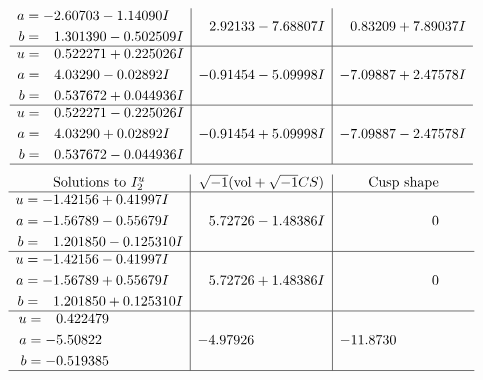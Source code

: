 \documentclass[1p]{elsarticle_modified}
\theoremstyle{definition}
\newcommand{\I}{\sqrt{-1}}
\begin{document}
$$\begin{array}{c|c|c}
\begin{aligned}
a &= -2.60703 - 1.14090 I \\
b &= \phantom{-}1.301390 - 0.502509 I\end{aligned}
 & \phantom{-}2.92133 - 7.68807 I & \phantom{-}0.83209 + 7.89037 I \\ \hline\begin{aligned}
u &= \phantom{-}0.522271 + 0.225026 I \\
a &= \phantom{-}4.03290 - 0.02892 I \\
b &= \phantom{-}0.537672 + 0.044936 I\end{aligned}
 & -0.91454 - 5.09998 I & -7.09887 + 2.47578 I \\ \hline\begin{aligned}
u &= \phantom{-}0.522271 - 0.225026 I \\
a &= \phantom{-}4.03290 + 0.02892 I \\
b &= \phantom{-}0.537672 - 0.044936 I\end{aligned}
 & -0.91454 + 5.09998 I & -7.09887 - 2.47578 I\\
 \hline 
 \end{array}$$\newpage$$\begin{array}{c|c|c}  
\text{Solutions to }I^u_{2}& \I (\text{vol} + \sqrt{-1}CS) & \text{Cusp shape}\\
 \hline 
\begin{aligned}
u &= -1.42156 + 0.41997 I \\
a &= -1.56789 - 0.55679 I \\
b &= \phantom{-}1.201850 - 0.125310 I\end{aligned}
 & \phantom{-}5.72726 - 1.48386 I & \phantom{-0.000000 } 0 \\ \hline\begin{aligned}
u &= -1.42156 - 0.41997 I \\
a &= -1.56789 + 0.55679 I \\
b &= \phantom{-}1.201850 + 0.125310 I\end{aligned}
 & \phantom{-}5.72726 + 1.48386 I & \phantom{-0.000000 } 0 \\ \hline\begin{aligned}
u &= \phantom{-}0.422479\phantom{ +0.000000I} \\
a &= -5.50822\phantom{ +0.000000I} \\
b &= -0.519385\phantom{ +0.000000I}\end{aligned}
 & -4.97926\phantom{ +0.000000I} & -11.8730\phantom{ +0.000000I}\\
 \hline 
 \end{array}$$\newpage
\end{document}
